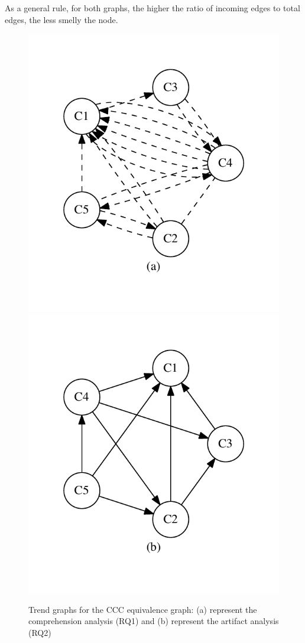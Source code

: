 As a general rule, for both graphs, the higher the ratio of incoming edges to total edges, the less smelly the node. 

\begin{figure}[tb]
\centering
\includegraphics[width=0.35\columnwidth]{graphs/ccom.pdf}
\includegraphics[width=0.35\columnwidth]{graphs/cart.pdf}
\vspace{-12pt}
\caption{Trend graphs for the CCC equivalence graph: (a) represent the comprehension analysis (RQ1) and (b) represent the artifact analysis (RQ2)}

\label{fig:graphsforanalysis}
\end{figure}



